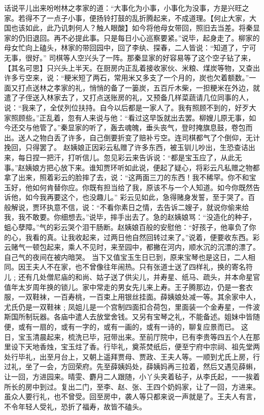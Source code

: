 \documentclass[12pt,oneside]{book}
\begin{document}
话说平儿出来吩咐林之孝家的道：“大事化为小事，小事化为没事，方是兴旺之家。若得不了一点子小事，便扬铃打鼓的乱折腾起来，不成道理。【何止大家，大国也该如此，此乃讥刺何人？触人眼酸】如今将他母女带回，照旧去当差。将秦显家的仍旧退回。再不必提此事。只是每日小心巡察要紧。”说毕，起身走了。柳家的母女忙向上磕头，林家的带回园中，回了李纨、探春，二人皆说：“知道了，宁可无事，很好。”
司棋等人空兴头了一阵。那秦显家的好容易等了这个空子钻了来，【其名可思】只兴头上半天。在厨房内正乱着接收家伙、米粮、煤炭等物，又查出许多亏空来，说：“粳米短了两石，常用米又多支了一个月的，炭也欠着额数。”一面又打点送林之孝家的礼，悄悄的备了一篓炭，五百斤木柴，一担粳米在外边，就遣了子侄送入林家去了，又打点送账房的礼，又预备几样菜蔬请几位同事的人，说：“我来了，全仗列位扶持。自今以后都是一家人了。我有照顾不到的，好歹大家照顾些。”正乱着，忽有人来说与他：“看过这早饭就出去罢。柳嫂儿原无事，如今还交与他管了。”秦显家的听了，轰去魂魄，垂头丧气，登时掩旗息鼓，卷包而出。送人之物白丢了许多，自己倒要折变了赔补亏空。连司棋都气了个倒仰，无计挽回，只得罢了。
赵姨娘正因彩云私赠了许多东西，被玉钏儿吵出，生恐查诘出来，每日捏一把汗，打听信儿。忽见彩云来告诉说：“都是宝玉应了，从此无事。”赵姨娘方把心放下来。谁知贾环听如此说，便起了疑心，将彩云凡私赠之物都拿了出来，照着彩云的脸摔了去，说：“这两面三刀的东西！我不稀罕。你不和宝玉好，他如何肯替你应。你既有担当给了我，原该不与一个人知道。如今你既然告诉他，如今我再要这个，也没趣儿。”
彩云见如此，急得赌身发誓，至于哭了。百般解说，贾环执意不信，说：“不看你素日之情，去告诉二嫂子，就说你偷来给我，我不敢要。你细想去。”说毕，摔手出去了。急的赵姨娘骂：“没造化的种子，蛆心孽障。”气的彩云哭个泪干肠断。赵姨娘百般的安慰他：“好孩子，他辜负了你的心，我看的真。让我收起来，过两日他自然回转过来了。”说着，便要收东西。彩云赌气一顿包起来，乘人不见时，来至园中，都撇在河内，顺水沉的沉漂的漂了。自己气的夜间在被内暗哭。
当下又值宝玉生日已到，原来宝琴也是这日，二人相同。因王夫人不在家，也不曾像往年闹热。只有张道士送了四样礼，换的寄名符儿﹔还有几处僧尼庙的和尚、姑子送了供尖儿，并寿星、纸马、疏头，并本命星官值年太岁周年换的锁儿。家中常走的男女先儿来上寿。王子腾那边，仍是一套衣服，一双鞋袜，一百寿桃，一百束上用银丝挂面。薛姨娘处减一等。其余家中人，尤氏仍是一双鞋袜﹔凤姐儿是一个宫制四面扣合荷包，里面装一个金寿星，一件波斯国所制玩器。各庙中遣人去放堂舍钱。又另有宝琴之礼，不能备述。姐妹中皆随便，或有一扇的，或有一字的，或有一画的，或有一诗的，聊复应景而已。
这日，宝玉清晨起来，梳洗已毕，冠带出来。至前厅院中，已有李贵等四五个人在那里设下天地香烛，宝玉炷了香。行毕礼，奠茶焚纸后，便至宁府中宗祠、祖先堂两处行毕礼，出至月台上，又朝上遥拜贾母、贾政、王夫人等。一顺到尤氏上房，行过礼，坐了一会，方回荣府。先至薛姨妈处，薛姨妈再三拉着，然后又遇见薛蝌，让一回，方进园来。晴雯、麝月二人跟随，小丫头夹着毡子，从李氏起，一一挨着所长的房中到过。复出二门，至李、赵、张、王四个奶妈家，让了一回，方进来。虽众人要行礼，也不曾受。回至房中，袭人等只都来说一声就是了。王夫人有言，不令年轻人受礼，恐折了福寿，故皆不磕头。
\end{document}
